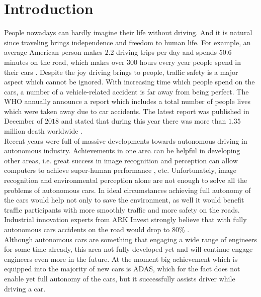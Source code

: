 
\chapter{Introduction}
\label{chap:0}

People nowadays can hardly imagine their life without driving. And it is natural since traveling brings independence and freedom to human life. For example, an average American person makes $2.2$ driving trips per day and spends $50.6$ minutes on the road, which makes over $300$ hours every year people spend in their cars \cite{americanDriving}. Despite the joy driving brings to people, traffic safety is a major aspect which cannot be ignored. With increasing time which people spend on the cars, a number of a vehicle-related accident is far away from being perfect. The \gls{WHO} annually announce a report which includes a total number of people lives which were taken away due to car accidents. The latest report was published in December of $2018$ and stated that during this year there was more than $1.35$ million death worldwide \cite{WHOstatistics}. \\

Recent years were full of massive developments towards autonomous driving in autonomous industry. Achievements in one area can be helpful in developing other areas, i.e. great success in image recognition and perception can allow computers to achieve super-human performance \cite{SuperComputer}, etc. Unfortunately, image recognition and environmental perception alone are not enough to solve all the problems of autonomous cars. In ideal circumstances achieving full autonomy of the cars would help not only to save the environment, as well it would benefit traffic participants with more smoothly traffic and more safety on the roads. Industrial innovation experts from ARK Invest strongly believe that with fully autonomous cars accidents on the road would drop to $80$\% \cite{ARKInvest}.\\

Although autonomous cars are something that engaging a wide range of engineers for some time already, this area not fully developed yet and will continue engage engineers even more in the future. At the moment big achievement which is equipped into the majority of new cars is \gls{ADAS}, which for the fact does not enable yet full autonomy of the cars, but it successfully assists driver while driving a car.\\

